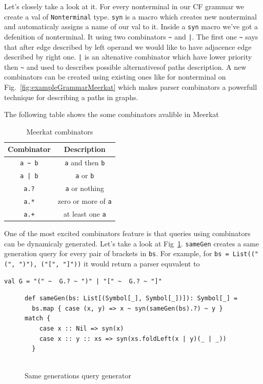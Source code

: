 Let's closely take a look at it. For every nonterminal in our CF grammar we create a val of  \lstinline{Nonterminal} type. \lstinline{syn} is a macro which creates new nonterminal and automaticaly assigns a name of our val to it. Inside a \lstinline{syn} macro we've got a defenition of nonterminal. It using two combinators \lstinline{~} and \lstinline{|}. The first one \lstinline{~} says that after edge described by left operand we would like to have adjacence edge described by right one. \lstinline{|} is an altenative combinator which have lower priority then \lstinline{~} and used to describes possible alternativesof paths description. A new combinators can be created using existing ones like for nonterminal on Fig.~\ref{fig:exampleGrammarMeerkat} which makes parser combinators a powerfull technique for describing a paths in graphs.

The following table shows the some combinators avalible in Meerkat 

\begin{table}[h]
\centering
\begin{tabular}{|c|c|}
\hline
\multicolumn{1}{|c|}{Combinator} & \multicolumn{1}{c|}{Description} \\ \hline
{\lstinline!a ~ b!} & {\lstinline!a!} and then {\lstinline!b!}   \\
{\lstinline!a | b!} & {\lstinline!a!} or {\lstinline!b!}         \\
{\lstinline!a.?!}   & {\lstinline!a!} or nothing   \\
{\lstinline!a.*!}   & zero or more of {\lstinline!a!} \\
{\lstinline!a.+!}   & at least one {\lstinline!a!} \\
\hline
\end{tabular}
\caption{Meerkat combinators}
\label{table:combinators}
\end{table}

One of the most excited combinators feature is that queries using combinators can be dynamicaly generated. Let's take a look at Fig~\ref{fig:gen}. \lstinline{sameGen} creates a same generation query for every pair of brackets in \lstinline{bs}. For example, for \lstinline{bs = List(("(", ")"), ("[", "]"))} it would return a parser equvalent to 
\begin{lstlisting}
val G = "(" ~  G.? ~ ")" | "[" ~  G.? ~ "]"
\end{lstlisting}
\begin{figure}[h]
\begin{lstlisting}
def sameGen(bs: List[(Symbol[_], Symbol[_])]): Symbol[_] =
  bs.map { case (x, y) => x ~ syn(sameGen(bs).?) ~ y } match {
    case x :: Nil => syn(x)
    case x :: y :: xs => syn(xs.foldLeft(x | y)(_ | _))
  }
  
\end{lstlisting}
\caption{Same generations query generator}
\label{fig:gen}
\end{figure}

